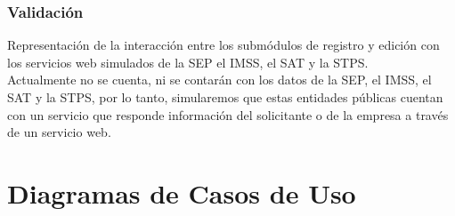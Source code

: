 \subsubsection{Validación}
Representación de la interacción entre los submódulos de registro y edición con los servicios web simulados de la SEP el IMSS, el SAT y la STPS.\\
Actualmente no se cuenta, ni se contarán con los datos de la SEP, el IMSS, el SAT y la STPS, por lo tanto, simularemos que estas entidades públicas cuentan con un servicio que responde información del solicitante o de la empresa a través de un servicio web.

\newpage
\section{Diagramas de Casos de Uso}
\bigskip

